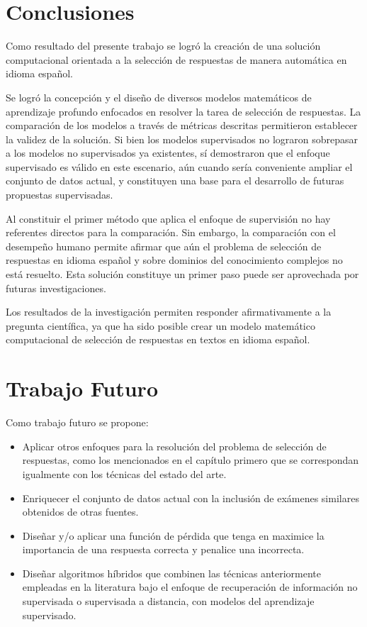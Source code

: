 \chapter*{Conclusiones}\label{chapter:conclusion}

Como resultado del presente trabajo se logró la creación de una solución computacional orientada a la selección de respuestas de manera automática en idioma español.

Se logró la concepción y el diseño de diversos modelos matemáticos de aprendizaje profundo enfocados en resolver la tarea de selección de respuestas. La comparación de los modelos a través de métricas descritas permitieron establecer la validez de la solución. Si bien los modelos supervisados no lograron sobrepasar a los modelos no supervisados ya existentes, sí demostraron que el enfoque supervisado es válido en este escenario, aún cuando sería conveniente ampliar el conjunto de datos actual, y constituyen una base para el desarrollo de futuras propuestas supervisadas.

Al constituir el primer método que aplica el enfoque de supervisión no hay referentes directos para la comparación. Sin embargo, la comparación con el desempeño humano permite afirmar que aún el problema de selección de respuestas en idioma español y sobre dominios del conocimiento complejos no está resuelto. Esta solución constituye un primer paso puede ser aprovechada por futuras investigaciones.

Los resultados de la investigación permiten responder afirmativamente a la pregunta científica, ya que ha sido posible crear un modelo matemático computacional de selección de respuestas en textos en idioma español.


\chapter*{Trabajo Futuro}\label{chapter:recomendation}

Como trabajo futuro se propone:

\begin{itemize}
	\item Aplicar otros enfoques para la resolución del problema de selección de respuestas, como los mencionados en el capítulo primero que se correspondan igualmente con los técnicas del estado del arte.
    \item Enriquecer el conjunto de datos actual con la inclusión de exámenes similares obtenidos de otras fuentes.     
    \item Diseñar y/o aplicar una función de pérdida que tenga en maximice la importancia de una respuesta correcta y penalice una incorrecta.
    \item Diseñar algoritmos híbridos que combinen las técnicas anteriormente empleadas en la literatura bajo el enfoque de recuperación de información no supervisada o supervisada a distancia, con modelos del aprendizaje supervisado.
\end{itemize}
